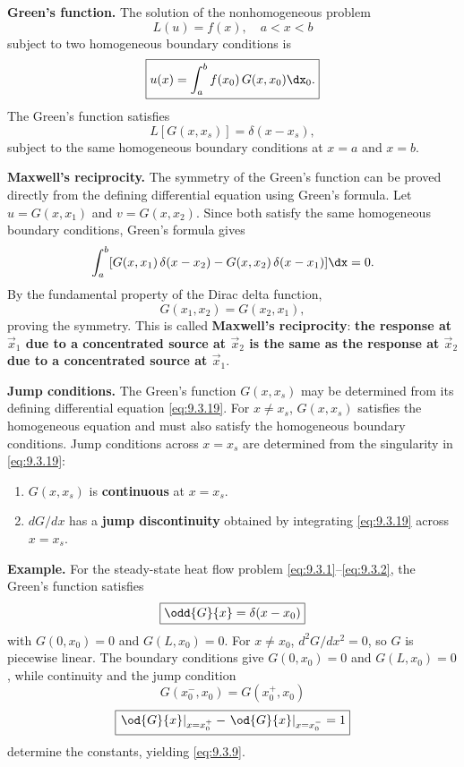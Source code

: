 \textbf{Green's function.}
The solution of the nonhomogeneous problem
\begin{equation}
\label{eq:9.3.17}
\boxed{L(u) = f(x), \quad a < x < b}
\end{equation}
subject to two homogeneous boundary conditions is
\begin{equation}
\label{eq:9.3.18}
\boxed{u(x) = \int_a^b f(x_0)\,G(x,x_0)\dx_0.}
\end{equation}
The Green's function satisfies
\begin{equation}
\label{eq:9.3.19}
\boxed{L[G(x,x_s)] = \delta(x - x_s),}
\end{equation}
subject to the same homogeneous boundary conditions at $x=a$ and $x=b$.

\textbf{Maxwell's reciprocity.}
The symmetry of the Green's function can be proved directly from the defining differential equation using Green's formula.  Let $u = G(x,x_1)$ and $v = G(x,x_2)$.  Since both satisfy the same homogeneous boundary conditions, Green's formula gives
\[
\int_a^b [G(x,x_1)\,\delta(x-x_2) - G(x,x_2)\,\delta(x-x_1)]\dx = 0.
\]
By the fundamental property of the Dirac delta function,
\begin{equation}
\label{eq:9.3.20}
\boxed{G(x_1,x_2) = G(x_2,x_1),}
\end{equation}
proving the symmetry.  This is called \textbf{Maxwell's reciprocity}: \textbf{the response at $\vec{x}_1$ due to a concentrated source at $\vec{x}_2$ is the same as the response at $\vec{x}_2$ due to a concentrated source at $\vec{x}_1$}.

\textbf{Jump conditions.}
The Green's function $G(x,x_s)$ may be determined from its defining differential equation \eqref{eq:9.3.19}.  For $x \neq x_s$, $G(x,x_s)$ satisfies the homogeneous equation and must also satisfy the homogeneous boundary conditions.  Jump conditions across $x = x_s$ are determined from the singularity in \eqref{eq:9.3.19}:
\begin{enumerate}
\item $G(x,x_s)$ is \textbf{continuous} at $x = x_s$.
\item $dG/dx$ has a \textbf{jump discontinuity} obtained by integrating \eqref{eq:9.3.19} across $x = x_s$.
\end{enumerate}

\textbf{Example.}
For the steady-state heat flow problem \eqref{eq:9.3.1}--\eqref{eq:9.3.2}, the Green's function satisfies
\begin{equation}
\label{eq:9.3.21}
\boxed{\odd{G}{x} = \delta(x - x_0)}
\end{equation}
with $G(0,x_0) = 0$ and $G(L,x_0) = 0$.  For $x \neq x_0$, $d^2G/dx^2 = 0$, so $G$ is piecewise linear.  The boundary conditions give $G(0,x_0) = 0$ and $G(L,x_0) = 0$, while continuity and the jump condition
\begin{equation}
\label{eq:9.3.22}
\boxed{G(x_0^-,x_0) = G(x_0^+,x_0)}
\end{equation}
\begin{equation}
\label{eq:9.3.23}
\boxed{\left.\od{G}{x}\right|_{x=x_0^+} - \left.\od{G}{x}\right|_{x=x_0^-} = 1}
\end{equation}
determine the constants, yielding \eqref{eq:9.3.9}.

